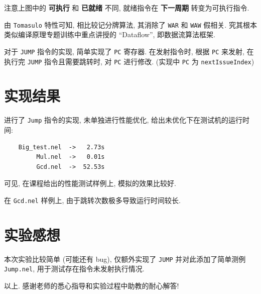 \documentclass[12pt]{article}
\begin{document}
\begin{CJK}{UTF8}{gbsn}
注意上图中的 \textbf{可执行} 和 \textbf{已就绪} 不同, 就绪指令在 \textbf{下一周期} 转变为可执行指令.

由 \verb|Tomasulo| 特性可知, 相比较记分牌算法, 其消除了 \verb|WAR| 和 \verb|WAW| 假相关. 究其根本类似编译原理专题训练中重点讲授的 ``Dataflow'', 即数据流算法框架.

对于 \verb|JUMP| 指令的实现, 简单实现了 \verb|PC| 寄存器. 在发射指令时, 根据 \verb|PC| 来发射, 在执行完 \verb|JUMP| 指令且需要跳转时, 对 \verb|PC| 进行修改. (实现中 \verb|PC| 为 \verb|nextIssueIndex|)

\section{实现结果}

进行了 \verb|Jump| 指令的实现, 未单独进行性能优化, 给出未优化下在测试机的运行时间:

\begin{verbatim}
    Big_test.nel  ->   2.73s
         Mul.nel  ->   0.01s
         Gcd.nel  ->  52.53s
\end{verbatim}

可见, 在课程给出的性能测试样例上, 模拟的效果比较好.

在 \verb|Gcd.nel| 样例上, 由于跳转次数极多导致运行时间较长.

\section{实验感想}

本次实验比较简单 (可能还有 bug), 仅额外实现了 \verb|JUMP| 并对此添加了简单测例 \verb|Jump.nel|, 用于测试存在指令未发射执行情况.

以上. 感谢老师的悉心指导和实验过程中助教的耐心解答!

\newpage

\end{CJK}
\end{document}
